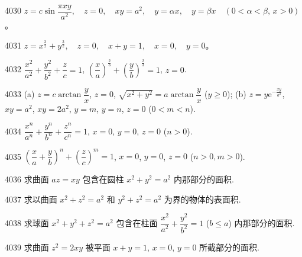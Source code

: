 \begin{prob}[S]{4030}
$z = c\sin\dfrac{\pi xy}{a^2}, \quad z = 0, \quad xy = a^2, \quad y = \alpha x, \quad y = \beta x \quad (0 < \alpha < \beta, \, x > 0)$。
\end{prob}

\begin{prob}[S]{4031}
$z = x^{\frac{3}{2}} + y^{\frac{3}{2}}, \quad z = 0, \quad x + y = 1, \quad x = 0, \quad y = 0$。
\end{prob}

\begin{prob}[S]{4032}
$\dfrac{x^2}{a^2} + \dfrac{y^2}{b^2} + \dfrac{z}{c} = 1$, $\left(\dfrac{x}{a}\right)^{\frac{2}{3}} + \left(\dfrac{y}{b}\right)^{\frac{2}{3}} = 1$, $z = 0$.
\end{prob}

\begin{prob}[M]{4033}
(a) $z = c\arctan\dfrac{y}{x}$, $z = 0$, $\sqrt{x^2 + y^2} = a\arctan\dfrac{y}{x}$ ($y \geqslant 0$); \qquad
(b) $z = y\mathrm{e}^{-\frac{xy}{a^2}}$, $xy = a^2$, $xy = 2a^2$, $y = m$, $y = n$, $z = 0$ ($0 < m < n$).
\end{prob}

\begin{prob}[S]{4034}
$\dfrac{x^n}{a^n} + \dfrac{y^n}{b^n} + \dfrac{z^n}{c^n} = 1$, $x = 0$, $y = 0$, $z = 0$ ($n > 0$).
\end{prob}

\begin{prob}[S]{4035}
$\left(\dfrac{x}{a} + \dfrac{y}{b}\right)^n + \left(\dfrac{z}{c}\right)^m = 1$, $x = 0$, $y = 0$, $z = 0$ ($n > 0, m > 0$).
\end{prob}


\begin{prob}[M]{4036}
求曲面 $az = xy$ 包含在圆柱 $x^2 + y^2 = a^2$ 内那部分的面积.
\end{prob}

\begin{prob}[M]{4037}
求以曲面 $x^2 + z^2 = a^2$ 和 $y^2 + z^2 = a^2$ 为界的物体的表面积.
\end{prob}

\begin{prob}[M]{4038}
求球面 $x^2 + y^2 + z^2 = a^2$ 包含在柱面 $\dfrac{x^2}{a^2} + \dfrac{y^2}{b^2} = 1$ ($b \leqslant a$) 内那部分的面积.
\end{prob}

\begin{prob}[M]{4039}
求曲面 $z^2 = 2xy$ 被平面 $x + y = 1$, $x = 0$, $y = 0$ 所截部分的面积.
\end{prob}

